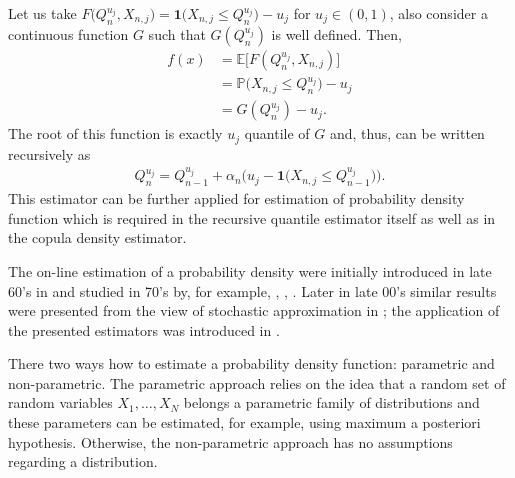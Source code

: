 \documentclass[12pt]{article}
\begin{document}
	Let us take $ F\big(Q^{u_j}_n, X_{n, j}\big) = \mathbf{1} \big(X_{n, j} \leq Q^{u_j}_n\big) - u_j $ for $ u_j \in (0, 1) $, also consider a continuous function $ G $ such that $ G(Q^{u_j}_n) $ is well defined. Then, 
	\begin{align}
		f(x) &= \mathbb{E}\big[F(Q^{u_j}_n, X_{n, j})\big] \\
		&=\mathbb{P}\big(X_{n, j}\leq Q^{u_j}_n\big) - u_j \\
		&= G(Q^{u_j}_n) - u_j.
	\end{align}
	The root of this function is exactly $ u_j $ quantile of $ G $ and, thus, can be written recursively as
	\begin{align}
		Q^{u_j}_n = Q^{u_j}_{n-1} + \alpha_n \Big(u_j - \mathbf{1}\big(X_{n, j}\leq Q^{u_j}_{n-1}\big)\Big).
	\end{align}
	This estimator can be further applied for estimation of probability density function which is required in the recursive quantile estimator itself as well as in the copula density estimator. 
	
	The on-line estimation of a probability density were initially introduced in late 60's in \textcite{Wolverton1969} and studied in 70's by, for example, \textcite{Yamato1971}, \textcite{Davies1973}, \textcite{Wegman1979}. Later in late 00's similar results were presented from the view of stochastic approximation in \textcite{Mokkadem2009}; the application of the presented estimators was introduced in \textcite{Slaoui2014}.
	
	There two ways how to estimate a probability density function: parametric and non-parametric. The parametric approach relies on the idea that a random set of random variables $ X_1, \dots, X_N $ belongs a parametric family of distributions and these parameters can be estimated, for example, using maximum a posteriori hypothesis. Otherwise, the non-parametric approach has no assumptions regarding a distribution. 
	
\end{document}
